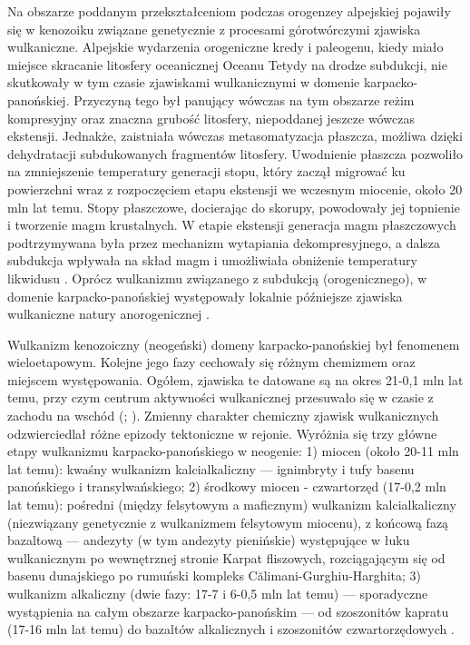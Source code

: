 \documentclass[11.5pt,twoside]{report}
\begin{document}
 Na obszarze poddanym przekształceniom podczas orogenzey alpejskiej pojawiły się w kenozoiku związane genetycznie z procesami górotwórczymi zjawiska wulkaniczne. Alpejskie wydarzenia orogeniczne kredy i paleogenu, kiedy miało miejsce skracanie litosfery oceanicznej Oceanu Tetydy na drodze subdukcji, nie skutkowały w tym czasie zjawiskami wulkanicznymi w domenie karpacko-panońskiej. Przyczyną tego był panujący wówczas na tym obszarze reżim kompresyjny oraz znaczna grubość litosfery, niepoddanej jeszcze wówczas ekstensji. Jednakże, zaistniała wówczas metasomatyzacja płaszcza, możliwa dzięki dehydratacji subdukowanych fragmentów litosfery. Uwodnienie płaszcza pozwoliło na zmniejszenie temperatury generacji stopu, który zaczął migrować ku powierzchni wraz z rozpoczęciem etapu ekstensji we wczesnym miocenie, około 20 mln lat temu. Stopy płaszczowe, docierając do skorupy, powodowały jej topnienie i tworzenie magm krustalnych. W etapie ekstensji generacja magm płaszczowych podtrzymywana była przez mechanizm wytapiania dekompresyjnego, a dalsza subdukcja wpływała na skład magm i umożliwiała obniżenie temperatury likwidusu \parencite{Harangi.2007}. Oprócz wulkanizmu związanego z subdukcją (orogenicznego), w domenie karpacko-panońskiej występowały lokalnie pó\'{z}niejsze zjawiska wulkaniczne natury anorogenicznej \parencite{Wilson.2006}.
 
 
 Wulkanizm kenozoiczny (neogeński) domeny karpacko-panońskiej był fenomenem wieloetapowym. Kolejne jego fazy cechowały się różnym chemizmem oraz miejscem występowania. Ogółem, zjawiska te datowane są na okres 21-0,1 mln lat temu, przy czym centrum aktywności wulkanicznej przesuwało się w czasie z zachodu na wschód (\cite{Lexa.2010}; \cite{Pecskay.1995}). Zmienny charakter chemiczny zjawisk wulkanicznych odzwierciedlał różne epizody tektoniczne w rejonie. Wyróżnia się trzy główne etapy wulkanizmu karpacko-panońskiego w neogenie: 1) miocen (około 20-11 mln lat temu): kwaśny wulkanizm kalcialkaliczny --- ignimbryty i tufy basenu panońskiego i transylwańskiego; 2) środkowy miocen - czwartorzęd (17-0,2 mln lat temu): pośredni (między felsytowym a maficznym) wulkanizm kalcialkaliczny (niezwiązany genetycznie z wulkanizmem felsytowym miocenu), z końcową fazą bazaltową --- andezyty (w tym andezyty pienińskie) występujące w łuku wulkanicznym po wewnętrznej stronie Karpat fliszowych, rozciągającym się od basenu dunajskiego po rumuński kompleks Călimani-Gurghiu-Harghita; 3) wulkanizm alkaliczny (dwie fazy: 17-7 i 6-0,5 mln lat temu) --- sporadyczne wystąpienia na całym obszarze karpacko-panońskim --- od szoszonitów kapratu (17-16 mln lat temu) do bazaltów alkalicznych i szoszonitów czwartorzędowych \parencite{Pecskay.1995}.
 
\end{document}
